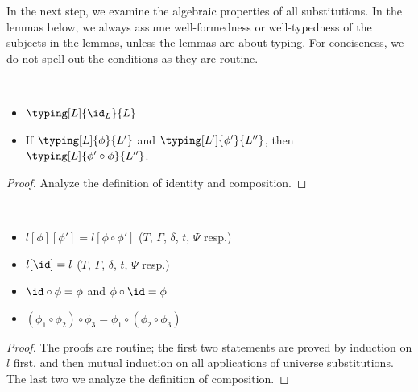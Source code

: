 In the next step, we examine the algebraic properties of all substitutions. %
In the lemmas below, we always assume well-formedness or well-typedness of the
subjects in the lemmas, unless the lemmas are about typing. %
For conciseness, we do not spell out the conditions as they are routine.
\begin{lemma} $ $
  \begin{itemize}
  \item $\typing[L]{\id_L}{L}$
  \item If $\typing[L]{\phi}{L'}$ and $\typing[L']{\phi'}{L''}$, then
    $\typing[L]{\phi' \circ \phi}{L''}$.
  \end{itemize}
\end{lemma}
\begin{proof}
  Analyze the definition of identity and composition.
\end{proof}
\begin{lemma} $ $
  \begin{itemize}
  \item $l[\phi][\phi'] = l[\phi \circ \phi']$ ($T$, $\Gamma$, $\delta$, $t$, $\Psi$ resp.)
  \item $l[\id] = l$ ($T$, $\Gamma$, $\delta$, $t$, $\Psi$ resp.)
  \item $\id \circ \phi = \phi$ and $\phi \circ \id = \phi$
  \item $(\phi_1 \circ \phi_2) \circ \phi_3 = \phi_1 \circ (\phi_2 \circ \phi_3)$
  \end{itemize}
\end{lemma}
\begin{proof}
  The proofs are routine; the first two statements are proved by induction on $l$
  first, and then mutual induction on all applications of universe substitutions. %
  The last two we analyze the definition of composition. 
\end{proof}

